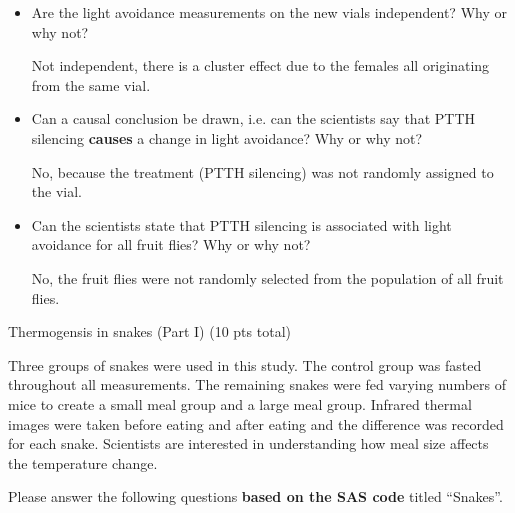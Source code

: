 \documentclass[10pt]{article}
\newcommand{\shortcorrect}[1]{{\color{red} #1}}
\newcommand{\shortcorrect}[1]{{\phantom{33.33}}}
\begin{document}
\begin{itemize}
\item Are the light avoidance measurements on the new vials independent? Why or why not? 

\shortcorrect{Not independent, there is a cluster effect due to the females all originating from the same vial.}\vspace*{1in}

\item Can a causal conclusion be drawn, i.e. can the scientists say that PTTH silencing {\bf causes} a change in light avoidance? Why or why not? 

\shortcorrect{No, because the treatment (PTTH silencing) was not randomly assigned to the vial.}\vspace*{1in}

\item Can the scientists state that PTTH silencing is associated with light avoidance for all fruit flies? Why or why not? 

\shortcorrect{No, the fruit flies were not randomly selected from the population of all fruit flies.}

\end{itemize}

\newpage
\noindent \begin{Large}Thermogensis in snakes (Part I) (10 pts total) \end{Large}

Three groups of snakes were used in this study. The control group
was fasted throughout all measurements. The remaining snakes were fed varying numbers of mice to create a small meal group and a
large meal group. Infrared thermal images were taken before eating and after eating and the difference was recorded for each snake. Scientists are interested in understanding how meal size affects the temperature change.

Please answer the following questions {\bf based on the SAS code} titled ``Snakes''.
\end{document}
